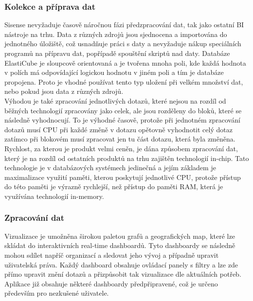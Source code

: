 \documentclass[czech,BP]{thesiskiv}
\begin{document}
 \subsubsection{Kolekce a příprava dat}
  Sisense nevyžaduje časově náročnou fázi předzpracování dat, tak jako ostatní BI nástroje na trhu. Data z různých zdrojů jsou sjednocena a importována do jednotného úložiště, což usnadňuje práci s daty a nevyžaduje nákup speciálních programů na přípravu dat, popřípadě spouštění skriptů nad daty. Databáze ElastiCube je sloupcově orientovaná a je tvořena mnoha poli, kde každá hodnota v polích má odpovídající logickou hodnotu v jiném poli a tím je databáze propojena. Proto je vhodné používat tento typ uložení při velkém množství dat, nebo pokud jsou data z různých zdrojů.
  \\
  Výhodou je také zpracování jednotlivých dotazů, které nejsou na rozdíl od běžných technologií zpracovány jako celek, ale jsou rozděleny do bloků, které se následně vyhodnocují. To je výhodné časově, protože při jednotném zpracování dotazů musí CPU při každé změně v dotazu opětovně vyhodnotit celý dotaz zatímco při blokovém musí zpracovat jen tu část dotazu, která byla změněna.\cite{ElasticCube}
  \\
  Rychlost, za kterou je produkt velmi ceněn, je dána způsobem zpracování dat, který je na rozdíl od ostatních produktů na trhu zajištěn technologií in-chip. Tato technologie je v databázových systémech jedinečná a jejím základem je maximalizace využití paměti, kterou poskytují jednotlivé CPU, protože přístup do této paměti je výrazně rychlejší, než přístup do paměti RAM, která je využívána technologií in-memory.
 \subsubsection{Zpracování dat}
 Vizualizace je umožněna širokou paletou grafů a geografických map, které lze skládat do interaktivních real-time dashboardů. Tyto dashboardy se následně mohou sdílet napříč organizací a sledovat jeho vývoj a případně upravit uživatelská práva. Každý dashboard obsahuje ovládací panely s filtry a lze zde přímo upravit znění dotazů a přizpůsobit tak vizualizace dle aktuálních potřeb. Aplikace již obsahuje některé dashboardy předpřipravené, což je určeno především pro nezkušené uživatele.\cite{SisenseVizualize}
 		
\end{document}
